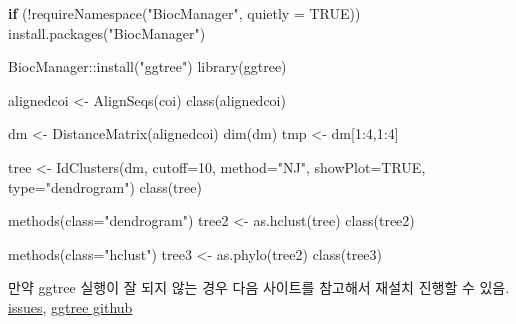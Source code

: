 \documentclass[
]{book}
\newenvironment{Shaded}{\begin{snugshade}}{\end{snugshade}}
\newcommand{\AttributeTok}[1]{\textcolor[rgb]{0.77,0.63,0.00}{#1}}
\newcommand{\ConstantTok}[1]{\textcolor[rgb]{0.00,0.00,0.00}{#1}}
\newcommand{\ControlFlowTok}[1]{\textcolor[rgb]{0.13,0.29,0.53}{\textbf{#1}}}
\newcommand{\DecValTok}[1]{\textcolor[rgb]{0.00,0.00,0.81}{#1}}
\newcommand{\FunctionTok}[1]{\textcolor[rgb]{0.00,0.00,0.00}{#1}}
\newcommand{\NormalTok}[1]{#1}
\newcommand{\OtherTok}[1]{\textcolor[rgb]{0.56,0.35,0.01}{#1}}
\newcommand{\SpecialCharTok}[1]{\textcolor[rgb]{0.00,0.00,0.00}{#1}}
\newcommand{\StringTok}[1]{\textcolor[rgb]{0.31,0.60,0.02}{#1}}
\begin{document}
\begin{Shaded}
\begin{Highlighting}[]
\ControlFlowTok{if}\NormalTok{ (}\SpecialCharTok{!}\FunctionTok{requireNamespace}\NormalTok{(}\StringTok{"BiocManager"}\NormalTok{, }\AttributeTok{quietly =} \ConstantTok{TRUE}\NormalTok{))}
    \FunctionTok{install.packages}\NormalTok{(}\StringTok{"BiocManager"}\NormalTok{)}

\NormalTok{BiocManager}\SpecialCharTok{::}\FunctionTok{install}\NormalTok{(}\StringTok{"ggtree"}\NormalTok{)}
\FunctionTok{library}\NormalTok{(ggtree)}


\NormalTok{alignedcoi }\OtherTok{\textless{}{-}} \FunctionTok{AlignSeqs}\NormalTok{(coi)}
\FunctionTok{class}\NormalTok{(alignedcoi)}

\NormalTok{dm }\OtherTok{\textless{}{-}} \FunctionTok{DistanceMatrix}\NormalTok{(alignedcoi)}
\FunctionTok{dim}\NormalTok{(dm)}
\NormalTok{tmp }\OtherTok{\textless{}{-}}\NormalTok{ dm[}\DecValTok{1}\SpecialCharTok{:}\DecValTok{4}\NormalTok{,}\DecValTok{1}\SpecialCharTok{:}\DecValTok{4}\NormalTok{]}

\NormalTok{tree }\OtherTok{\textless{}{-}} \FunctionTok{IdClusters}\NormalTok{(dm, }\AttributeTok{cutoff=}\DecValTok{10}\NormalTok{, }\AttributeTok{method=}\StringTok{"NJ"}\NormalTok{, }\AttributeTok{showPlot=}\ConstantTok{TRUE}\NormalTok{, }\AttributeTok{type=}\StringTok{"dendrogram"}\NormalTok{)}
\FunctionTok{class}\NormalTok{(tree)}

\FunctionTok{methods}\NormalTok{(}\AttributeTok{class=}\StringTok{"dendrogram"}\NormalTok{)}
\NormalTok{tree2 }\OtherTok{\textless{}{-}} \FunctionTok{as.hclust}\NormalTok{(tree)}
\FunctionTok{class}\NormalTok{(tree2)}

\FunctionTok{methods}\NormalTok{(}\AttributeTok{class=}\StringTok{"hclust"}\NormalTok{)}
\NormalTok{tree3 }\OtherTok{\textless{}{-}} \FunctionTok{as.phylo}\NormalTok{(tree2)}
\FunctionTok{class}\NormalTok{(tree3)}
\end{Highlighting}
\end{Shaded}

만약 ggtree 실행이 잘 되지 않는 경우 다음 사이트를 참고해서 재설치 진행할 수 있음. \href{https://github.com/YuLab-SMU/ggtree/issues/395}{issues}, \href{https://github.com/YuLab-SMU/ggtree}{ggtree github}
\end{document}

